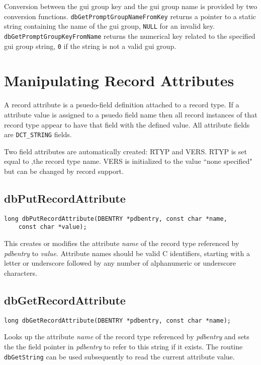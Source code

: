 Conversion between the gui group key and the gui group name is provided by two conversion functions.
\verb|dbGetPromptGroupNameFromKey| returns a pointer to a static string containing the name of the gui group,
\verb|NULL| for an invalid key.
\verb|dbGetPromptGroupKeyFromName| returns the numerical key related to the specified gui group string,
\verb|0| if the string is not a valid gui group.

\section{Manipulating Record Attributes}

A record attribute is a psuedo-field definition attached to a record type. If a attribute value is assigned to a psuedo field 
name then all record instances of that record type appear to have that field with the defined value. All attribute fields are 
\verb|DCT_STRING| fields.

Two field attributes are automatically created: RTYP and VERS. RTYP is set equal to ,the record type name. VERS is 
initialized to the value ``none specified" but can be changed by record support.

\subsection{dbPutRecordAttribute}

\begin{verbatim}
long dbPutRecordAttribute(DBENTRY *pdbentry, const char *name,
    const char *value);
\end{verbatim}

This creates or modifies the attribute \emph{name} of the record type referenced by \emph{pdbentry} to \emph{value}.
Attribute names should be valid C identifiers, starting with a letter or underscore followed by any number of alphanumeric or underscore characters.

\subsection{dbGetRecordAttribute}

\begin{verbatim}
long dbGetRecordAttribute(DBENTRY *pdbentry, const char *name);
\end{verbatim}

Looks up the attribute \emph{name} of the record type referenced by \emph{pdbentry} and sets the the field pointer in \emph{pdbentry} to refer to this string if it exists.
The routine \verb|dbGetString| can be used subsequently to read the current attribute value.

